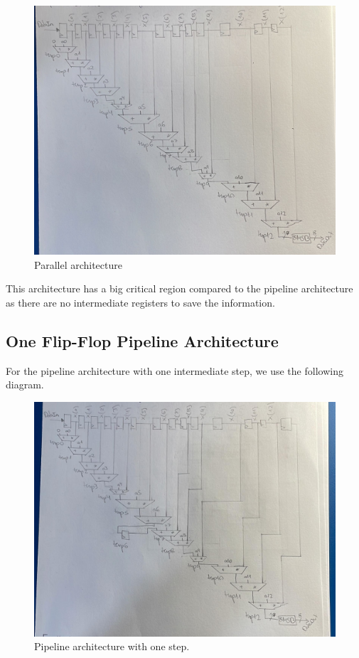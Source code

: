 \documentclass[a4paper, 12pt]{article}
\begin{document}
\begin{figure}[htbp]
\centering
\includegraphics[width=.9\linewidth]{./img/architecture_parallel.jpg}
\caption{Parallel architecture}
\end{figure}

This architecture has a big critical region compared to the pipeline architecture as there are no intermediate registers to save the information.
\subsection{One Flip-Flop Pipeline Architecture}
\label{sec:org5033faa}

For the pipeline architecture with one intermediate step, we use the following diagram.

\begin{figure}[htbp]
\centering
\includegraphics[width=.9\linewidth]{./img/architecture_pipeline_simple.jpg}
\caption{Pipeline architecture with one step.}
\end{figure}
\end{document}

